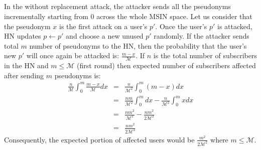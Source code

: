 \documentclass{llncs} %
\begin{document}
\begin{subappendices}
\section{} \label{appendix:B}
In the without replacement attack, the attacker sends all the pseudonyms incrementally starting from $0$ across the whole MSIN space. Let us consider that the pseudonym $x$ is the first attack on a user's $p'$. Once the user's $p'$ is attacked, HN updates $p \leftarrow p'$ and choose a new unused $p'$ randomly. If the attacker sends total $m$ number of pseudonyms to the HN, then the probability that the user's new $p'$ will once again be attacked is: $\frac{m-x}{\mathcal{M}}$. If $n$ is the total number of subscribers in the HN and $m \leq \mathcal{M}$ (first round) then expected number of subscribers affected after sending $m$ pseudonyms is:
\begin{eqnarray*}
 \frac{n}{\mathcal{M}}\int_{0}^{m}\frac{m-x}{\mathcal{M}}dx &=& \frac{n}{\mathcal{M}^2}\int_{0}^{m}\left(m-x\right)dx\\
 &=& \frac{nm}{\mathcal{M}^2}\int_{0}^{m}dx - \frac{n}{\mathcal{M}^2}\int_{0}^{m}xdx\\
 &=& \frac{nm^2}{\mathcal{M}^2} - \frac{nm^2}{2\mathcal{M}^2}\\
  &=& \frac{nm^2}{2\mathcal{M}^2}
\end{eqnarray*}
Consequently, the expected portion of affected users would be $\frac{m^2}{2\mathcal{M}^2}$ where $m \leq \mathcal{M}$.


\end{subappendices}
\end{document}
